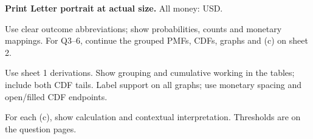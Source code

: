 \textbf{Print Letter portrait at actual size.} All money: USD.\par
Use clear outcome abbreviations; show probabilities, counts and monetary mappings.
For Q3--6, continue the grouped PMFs, CDFs, graphs and (c) on sheet 2.\par
{}
\vspace{2mm}
\vspace{2mm}
\clearpage
{}
Use sheet 1 derivations. Show grouping and cumulative working in the tables; include both CDF tails.
Label support on all graphs; use monetary spacing and open/filled CDF endpoints.\par
For each (c), show calculation and contextual interpretation. Thresholds are on the question pages.\par
{}
 {}
\vspace{3mm}
 {}
\par\clearpage
\endgroup


